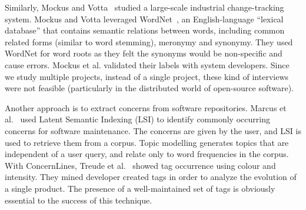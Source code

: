 \documentclass[smallextended]{svjour3}       %
\begin{document}

Similarly, Mockus and Votta~\cite{Mockus00} studied a large-scale industrial change-tracking system. 
Mockus and Votta leveraged WordNet~\cite{Fellbaum1998}, an English-language ``lexical database'' that contains semantic relations between words,
including common related forms (similar to word stemming), meronymy and synonymy.
They used WordNet for word roots as they felt the synonyms would be
non-specific and cause errors.
Mockus et al. validated their labels with system developers.
Since we study multiple projects, instead of a single project, these
kind of interviews were not feasible (particularly in the distributed world of open-source software).

Another approach is to extract concerns from software repositories.
Marcus et al.~\cite{marcus04wcre} used Latent Semantic Indexing (LSI)
to identify commonly occurring concerns for software maintenance. 
The
concerns are given by the user, and LSI is used to retrieve them from
a corpus. 
Topic modelling generates topics that are independent of a user query, and relate only to word frequencies in the corpus.
With ConcernLines, Treude et al.~\cite{treude09cl} showed tag occurrence
using colour and intensity. 
They mined
developer created tags 
in order to analyze the evolution of a single product.
The presence of a well-maintained set of tags is obviously essential to the success of this technique.

\end{document}
